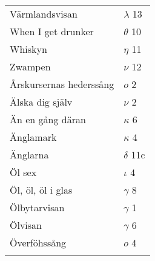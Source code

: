 \documentclass[a6paper,10pt]{article}
\begin{document}
\begin{table}[!h]
\begin{tabular}{l l}
Värmlandsvisan	&$\lambda$ 13\\
When I get drunker	&$\theta$ 10\\
Whiskyn	&$\eta$ 11\\
Zwampen&	$\nu$ 12\\
Årskursernas hederssång&$o$ 2\\
Älska dig själv&$\nu$ 2\\
Än en gång däran&$\kappa$ 6\\
Änglamark&$\kappa$ 4\\
Änglarna&$\delta$ 11c\\
Öl sex&	$\iota$ 4\\
Öl, öl, öl i glas	&$\gamma$ 8\\
Ölbytarvisan	&$\gamma$ 1\\
Ölvisan&$\gamma$ 6\\
Överföhssång&	$o$ 4\\
\vspace{180pt}
\end{tabular}
\end{table}
\end{document}
